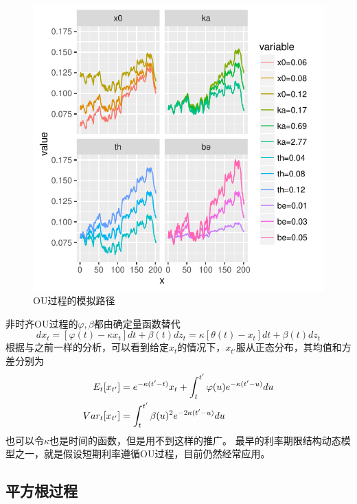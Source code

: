 \documentclass[UTF8]{ctexart}
\begin{document}
\begin{figure}[H]
\centering
\includegraphics{P54.pdf}

\caption*{OU过程的模拟路径\footnotemark}
\end{figure}

非时齐OU过程的$\varphi,\beta$都由确定量函数替代
$$dx_t=[\varphi(t)-\kappa x_t]dt+\beta(t)dz_t=\kappa[\theta(t)-x_t]dt+\beta(t)dz_t$$
根据与之前一样的分析，可以看到给定$x_t$的情况下，$x_{t'}$服从正态分布，其均值和方差分别为
\begin{align}
E_t[x_{t'}] &= e^{-\kappa (t'-t)}x_t+\int_t^{t'}\varphi(u) e^{-\kappa (t'-u)} du \notag \\
Var_t[x_{t'}] &=\int_t^{t'}\beta(u)^2 e^{-2 \kappa(t'-u)}du \notag
\end{align}
也可以令$\kappa$也是时间的函数，但是用不到这样的推广。
最早的利率期限结构动态模型之一，就是假设短期利率遵循OU过程，目前仍然经常应用。

\subsection{平方根过程}
\end{document}
